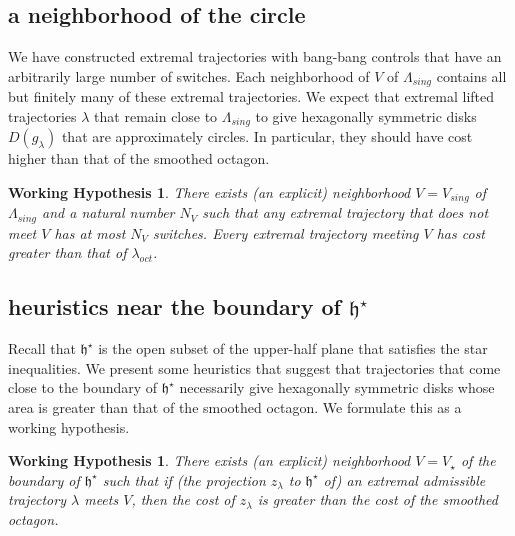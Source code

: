 \documentclass{article}
\newtheorem{working}[theorem]{Working Hypothesis}
\theoremstyle{remark}
\newcommand{\op}[1]{\hbox{#1}}
\def\h{\mathfrak h}
\def\hstar{{\mathfrak h}^\star}
\newcommand\Lsing{\Lambda_{sing}}
\begin{document}


\subsection{a neighborhood of the circle}

We have constructed extremal trajectories with bang-bang controls
that have an arbitrarily large
number of switches.  Each neighborhood of $V$ of $\Lsing$ contains
all but finitely many of these extremal trajectories.  We expect that 
extremal lifted trajectories $\lambda$
that remain close to $\Lsing$ to give hexagonally symmetric
disks $D(g_\lambda)$ that are approximately circles.  In particular,
they should have cost higher than that of the smoothed octagon.

\begin{working}  There exists (an explicit) neighborhood $V=V_{sing}$ of $\Lsing$ and
a natural number $N_V$ such that any extremal trajectory that
does not meet $V$ has at most $N_V$ switches.  Every extremal trajectory
meeting $V$ has cost greater than that of $\lambda_{oct}$.
\end{working}

\subsection{heuristics near the boundary of $\hstar$}

Recall that $\hstar$ is the open subset
of the upper-half plane that satisfies the star inequalities.
We present some heuristics that suggest that trajectories that come
close to the boundary of $\hstar$ necessarily give hexagonally symmetric disks
whose area is greater than that of the smoothed octagon.  We formulate
this as a working hypothesis.  

\begin{working}\label{hyp:star}   There exists (an explicit) neighborhood $V=V_\star$ of the
  boundary of $\hstar$ such that if (the projection $z_\lambda$ to
  $\hstar$ of) an extremal admissible trajectory $\lambda$ meets $V$,
  then the cost of $z_\lambda$ is greater than the cost of the
  smoothed octagon.
\end{working}
\end{document}
